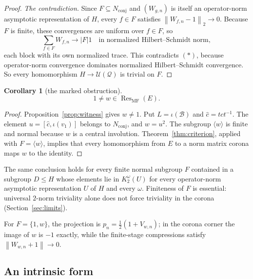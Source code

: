 \documentclass[11pt]{amsart}
\newcommand{\leanverified}[2]{\ignorespaces}
\newtheorem{corollary}[theorem]{Corollary}
\theoremstyle{definition}
\theoremstyle{remark}
\theoremstyle{plain}
\newcommand{\U}{\mathcal U}
\newcommand{\opnorm}[1]{\left\lVert #1\right\rVert}
\newcommand{\hsnorm}[1]{\left\lVert #1\right\rVert_{2}}
\begin{document}
\begin{proof}
\emph{The contradiction.}  Since $F\subseteq N_{\mathrm{conj}}$ and
$(W_{g,n})$ is itself an operator-norm asymptotic representation of
$H$, every $f\in F$ satisfies $\hsnorm{W_{f,n}-1}\to0$.  Because $F$
is finite, these convergences are uniform over $f\in F$, so
\[
 \sum_{f\in F}W_{f,n}\longrightarrow |F|1
 \quad\text{in normalized Hilbert--Schmidt norm},
\]
each block with its own normalized trace.  This contradicts
\((\ast)\), because operator-norm convergence dominates normalized
Hilbert--Schmidt convergence.  So every homomorphism
$H\to\U(\mathcal Q)$ is trivial on $F$.
\end{proof}

\begin{corollary}[the marked obstruction]\label{cor:marked-obstruction}
\[
 1\ne w\in\operatorname{Res}_{\mathrm{MF}}(E).
\]
\leanverified{Sofic/LiteralNonMFEndpoint}{GroupApproximation.LiteralNonMFEndpoint.literal_mark_mem_manuscriptCoronaMFResidual}
\leanverified{Sofic/LiteralNonMFLinearWitness}{GroupApproximation.LiteralNonMFLinearWitness.literal_mark_ne_one}
\end{corollary}

\begin{proof}
Proposition~\ref{prop:witness} gives $w\ne1$.  Put
$L=\iota(\mathcal B)$ and $\hat c=tct^{-1}$.  The element
$u=[\hat c,\iota(v_1)]$ belongs to $N_{\mathrm{conj}}$, and $w=u^2$.
The subgroup $\langle w\rangle$ is finite and normal because $w$ is a central
involution.  Theorem~\ref{thm:criterion}, applied with
$F=\langle w\rangle$, implies that every homomorphism from $E$ to a norm
matrix corona maps $w$ to the identity.
\end{proof}

The same conclusion holds for every finite normal subgroup $F$ contained
in a subgroup $D\le H$ whose elements lie in $K_2^{\omega}(U)$ for every
operator-norm asymptotic representation $U$ of $H$ and every $\omega$.
Finiteness of $F$ is essential: universal $2$-norm triviality alone does
not force triviality in the corona (Section~\ref{sec:limits}).

For $F=\{1,w\}$, the projection is
$p_n=\tfrac12(1+V_{w,n})$; in the corona corner the image of $w$ is
$-1$ exactly, while the finite-stage compressions satisfy
$\opnorm{W_{w,n}+1}\to0$.

\subsection{An intrinsic form}
\end{document}
